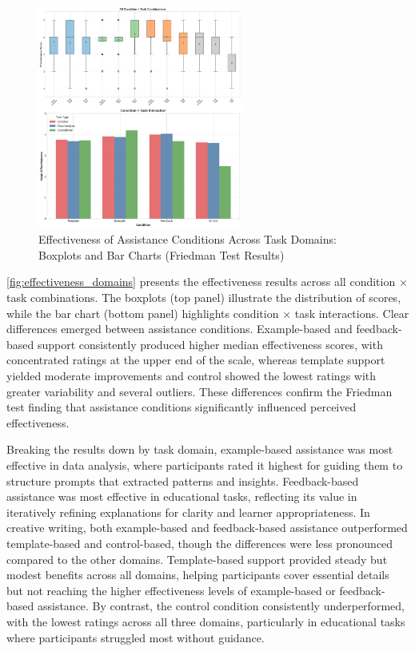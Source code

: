 \begin{figure}[h]
\centering
\includegraphics[width=0.6\textwidth]{figures/04.jpg}
\caption{Effectiveness of Assistance Conditions Across Task Domains: Boxplots and Bar Charts (Friedman Test Results)}
\label{fig:effectiveness_domains}
\end{figure}

\autoref{fig:effectiveness_domains} presents the effectiveness results across all condition × task combinations. The boxplots (top panel) illustrate the distribution of scores, while the bar chart (bottom panel) highlights condition × task interactions. Clear differences emerged between assistance conditions. Example-based and feedback-based support consistently produced higher median effectiveness scores, with concentrated ratings at the upper end of the scale, whereas template support yielded moderate improvements and control showed the lowest ratings with greater variability and several outliers. These differences confirm the Friedman test finding that assistance conditions significantly influenced perceived effectiveness.

Breaking the results down by task domain, example-based assistance was most effective in data analysis, where participants rated it highest for guiding them to structure prompts that extracted patterns and insights. Feedback-based assistance was most effective in educational tasks, reflecting its value in iteratively refining explanations for clarity and learner appropriateness. In creative writing, both example-based and feedback-based assistance outperformed template-based and control-based, though the differences were less pronounced compared to the other domains. Template-based support provided steady but modest benefits across all domains, helping participants cover essential details but not reaching the higher effectiveness levels of example-based or feedback-based assistance. By contrast, the control condition consistently underperformed, with the lowest ratings across all three domains, particularly in educational tasks where participants struggled most without guidance.


